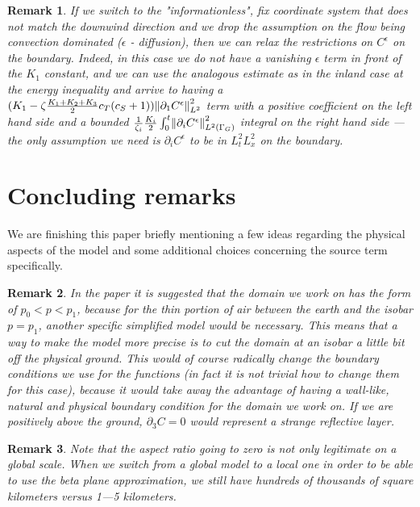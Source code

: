 \documentclass[11pt]{article}
\newtheorem{remark}{Remark}
\begin{document}
\begin{remark}
If we switch to the "informationless", fix coordinate system that does not match the downwind direction and we drop the assumption on the flow being convection dominated ($\epsilon$ - diffusion), then we can relax the restrictions on $C^\epsilon$ on the boundary. Indeed, in this case we do not have a vanishing $\epsilon$ term in front of the $K_1$ constant, and we can use the analogous estimate as in the inland case at the energy inequality and arrive to having a $(K_1 - \zeta \frac{K_1 + K_2 + K_3}{2} c_T (c_S + 1)) \norm{\partial_1 C^\epsilon}_{L^2}^2$ term with a positive coefficient on the left hand side and a bounded $\frac{1}{\zeta_i} \frac{K_i}{2} \int_0 ^ t \norm{\partial_i C^\epsilon}^2 _{L^2 (\Gamma_G)}$ integral on the right hand side --- the only assumption we need is $\partial_i C^\epsilon$ to be in $L^2_t L^2_x$ on the boundary.
\end{remark}

\section{Concluding remarks} \label{concludingremarks}

We are finishing this paper briefly mentioning a few ideas regarding the physical aspects of the model and some additional choices concerning the source term specifically.

\begin{remark}
\normalfont In the paper \cite{temam2005some} it is suggested that the domain we work on has the form of $p_0 < p < p_1$, because for the thin portion of air between the earth and the isobar $p = p_1$, another specific simplified model would be necessary. This means that a way to make the model more precise is to cut the domain at an isobar a little bit off the physical ground. This would of course radically change the boundary conditions we use for the functions (in fact it is not trivial how to change them for this case), because it would take away the advantage of having a wall-like, natural and physical boundary condition for the domain we work on. If we are positively above the ground, $\partial_3 C = 0$ would represent a strange reflective layer.
\end{remark}

\begin{remark}
\normalfont Note that the aspect ratio going to zero is not only legitimate on a global scale. When we switch from a global model to a local one in order to be able to use the beta plane approximation, we still have hundreds of thousands of square kilometers versus 1---5 kilometers.
\end{remark}
\end{document}
